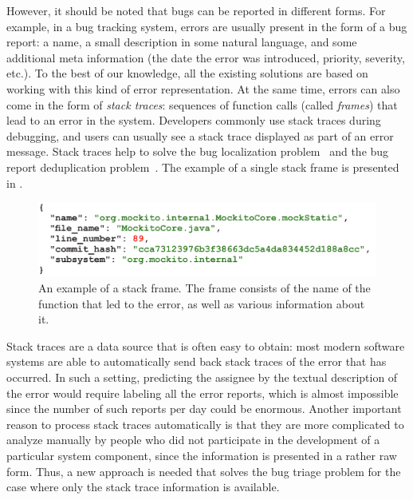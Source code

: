 However, it should be noted that bugs can be reported in different forms. For example, in a bug tracking system, errors are usually present in the form of a bug report: a name, a small description in some natural language, and some additional meta information (the date the error was introduced, priority, severity, etc.). To the best of our knowledge, all the existing solutions are based on working with this kind of error representation. At the same time, errors can also come in the form of \textit{stack traces}: sequences of function calls (called \textit{frames}) that lead to an error in the system. Developers commonly use stack traces during debugging, and users can usually see a stack trace displayed as part of an error message. Stack traces help to solve the bug localization problem~\cite{Wong2014BoostingBF, Moreno2014OnTU, Youm2015BugLB} and the bug report deduplication problem~\cite{Dang2012ReBucketAM, Sabor2017DURFEXAF, Khvorov2021S3MSS}. The example of a single stack frame is presented in . 

\begin{figure}[h]
    \centering
    \includegraphics[width=\columnwidth]{figures/01-introduction/frame-example.pdf}
    \vspace{-0.5cm}
    \caption{An example of a stack frame. The frame consists of the name of the function that led to the error, as well as various information about it.}
    \label{fig:introduction-frame-example}
\end{figure}

Stack traces are a data source that is often easy to obtain: most modern software systems are able to automatically send back stack traces of the error that has occurred. In such a setting, predicting the assignee by the textual description of the error would require labeling all the error reports, which is almost impossible since the number of such reports per day could be enormous. Another important reason to process stack traces automatically is that they are more complicated to analyze manually by people who did not participate in the development of a particular system component, since the information is presented in a rather raw form. Thus, a new approach is needed that solves the bug triage problem for the case where only the stack trace information is available.

